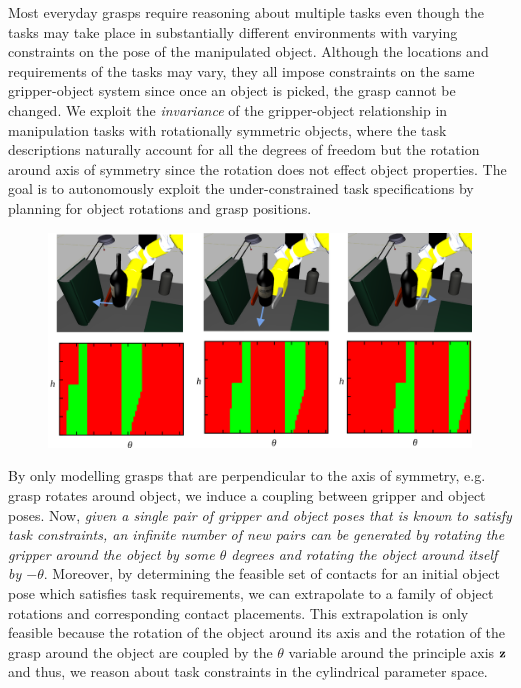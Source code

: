 \documentclass{aamas2015}
\begin{document}
Most everyday grasps require reasoning about multiple tasks even though the tasks may take place in substantially different environments with varying constraints on the pose of the manipulated
object. Although the locations and requirements of the tasks may vary, they all impose constraints 
on the same gripper-object system since once an object is picked, the grasp cannot be changed. 
We exploit the \textit{invariance} of the gripper-object relationship in manipulation tasks with 
rotationally symmetric objects, where the task descriptions naturally account for all the degrees 
of freedom but the rotation around axis of symmetry since the rotation does not effect object properties. The goal is to autonomously exploit the under-constrained task specifications by planning for object rotations and grasp positions. 
\begin{figure}[ht]
  \begin{center}
    \includegraphics[width=0.75\linewidth]{./images/rotatingWine.png} \quad
  \end{center}
  \label{fig:rotatingwine} 
\end{figure}
By only modelling grasps that are perpendicular to the axis of symmetry, e.g. grasp rotates around object, we induce a coupling between gripper and object poses. Now, \textit{given a single pair of gripper and object poses that is known to satisfy task constraints, an infinite number of new pairs can be generated by rotating the gripper around the object by some $\theta$ degrees and rotating the object around itself by $-\theta$}. Moreover, by determining the feasible set of contacts for an initial object
pose which satisfies task requirements, we can extrapolate to a family of object rotations and corresponding contact placements. This extrapolation is only feasible because the rotation of the object around its axis and the rotation of the grasp around the object are coupled by the $\theta$ variable around the principle axis $\textbf{z}$ and thus, we reason about task
constraints in the cylindrical parameter space.
\end{document}
